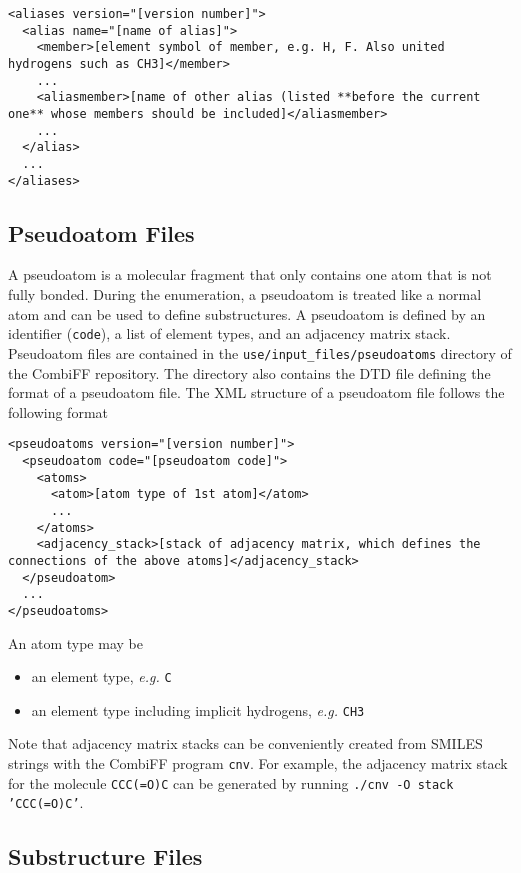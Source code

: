 \documentclass[a4paper,11pt]{article}
\begin{document}
\begin{lstlisting}
<aliases version="[version number]">
  <alias name="[name of alias]">
    <member>[element symbol of member, e.g. H, F. Also united hydrogens such as CH3]</member>
    ...
    <aliasmember>[name of other alias (listed **before the current one** whose members should be included]</aliasmember>
    ...
  </alias>
  ...
</aliases>
\end{lstlisting}

\subsection{Pseudoatom Files}\label{sec:pseudoatoms}

A pseudoatom is a molecular fragment that only contains one atom that is not fully bonded.\cite{Rieder2022} During the enumeration, a pseudoatom is treated like a normal atom and can be used to define substructures. A pseudoatom is defined by an identifier (\texttt{code}), a list of element types, and an adjacency matrix stack. Pseudoatom files are contained in the \texttt{use/input\_files/pseudoatoms} directory of the CombiFF repository. The directory also contains the DTD file defining the format of a pseudoatom file. The XML structure of a pseudoatom file follows the following format

\begin{lstlisting}
<pseudoatoms version="[version number]">
  <pseudoatom code="[pseudoatom code]">
    <atoms>
      <atom>[atom type of 1st atom]</atom>
      ...
    </atoms>
    <adjacency_stack>[stack of adjacency matrix, which defines the connections of the above atoms]</adjacency_stack>
  </pseudoatom>
  ...
</pseudoatoms>
\end{lstlisting}

An atom type may be

\begin{itemize}
  \item an element type, \textit{e.g.} \texttt{C}
  \item an element type including implicit hydrogens, \textit{e.g.} \texttt{CH3}
\end{itemize}

Note that adjacency matrix stacks can be conveniently created from SMILES strings with the CombiFF program \texttt{cnv}. For example, the adjacency matrix stack for the molecule \texttt{CCC(=O)C} can be generated by running \texttt{./cnv -O stack 'CCC(=O)C'}.

\subsection{Substructure Files}\label{sec:substructures}
\end{document}

